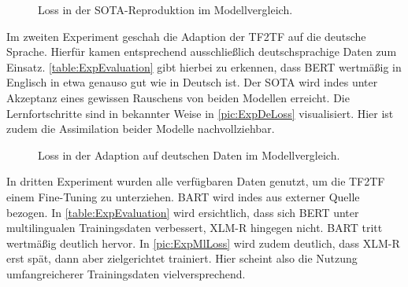 \begin{figure}[h]
  \centering
  \caption{Loss in der SOTA-Reproduktion im Modellvergleich.}
  \label{pic:ExpEnLoss}
\end{figure}

\noindent
Im zweiten Experiment geschah die Adaption der \ac{TF2TF} auf die deutsche Sprache. Hierfür kamen entsprechend ausschließlich deutschsprachige Daten zum Einsatz. \autoref{table:ExpEvaluation} gibt hierbei zu erkennen, dass \ac{BERT} wertmäßig in Englisch in etwa genauso gut wie in Deutsch ist. Der \ac{SOTA} wird indes unter Akzeptanz eines gewissen Rauschens von beiden Modellen erreicht. Die Lernfortschritte sind in bekannter Weise in \autoref{pic:ExpDeLoss} visualisiert. Hier ist zudem die Assimilation beider Modelle nachvollziehbar.\\

\begin{figure}[h]
  \centering
  \caption{Loss in der Adaption auf deutschen Daten im Modellvergleich.}
  \label{pic:ExpDeLoss}
\end{figure}
\newpage

\noindent
In dritten Experiment wurden alle verfügbaren Daten genutzt, um die \ac{TF2TF} einem Fine-Tuning zu unterziehen. \ac{BART} wird indes aus externer Quelle bezogen. In \autoref{table:ExpEvaluation} wird ersichtlich, dass sich \ac{BERT} unter multilingualen Trainingsdaten verbessert, \ac{XLM-R} hingegen nicht. \ac{BART} tritt wertmäßig deutlich hervor. In \autoref{pic:ExpMlLoss} wird zudem deutlich, dass \ac{XLM-R} erst spät, dann aber zielgerichtet trainiert. Hier scheint also die Nutzung umfangreicherer Trainingsdaten vielversprechend.\\

